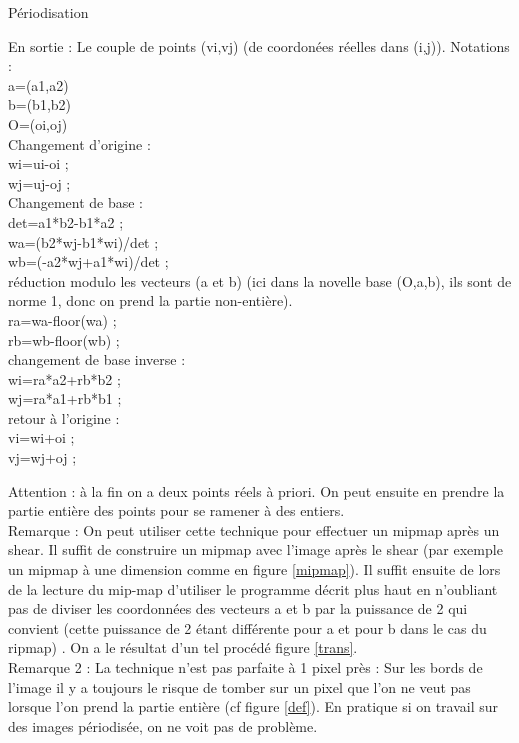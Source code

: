 \documentclass{article}
\begin{document}
\begin{algorithm}
\caption{Périodisation}
En sortie : Le couple de points (vi,vj) (de coordonées réelles dans (i,j)).  \;
Notations : \\
a=(a1,a2)\\
b=(b1,b2)\\
O=(oi,oj)\\
Changement d'origine :\\
 wi=ui-oi ;\\
wj=uj-oj ;\\
Changement de base :\\
det=a1*b2-b1*a2 ;\\
wa=(b2*wj-b1*wi)/det ;\\
wb=(-a2*wj+a1*wi)/det ;\\

réduction modulo les vecteurs (a et b) (ici dans la novelle base (O,a,b), ils sont de norme 1,
donc on prend la partie non-entière).\\

ra=wa-floor(wa) ;\\
rb=wb-floor(wb) ;\\

  changement de base inverse :\\

wi=ra*a2+rb*b2 ;\\
wj=ra*a1+rb*b1 ;\\

 retour à l'origine :\\
 
vi=wi+oi ;\\
vj=wj+oj ;\\


\end{algorithm}

Attention : à la fin on a deux points réels à priori. On peut ensuite en prendre la partie entière des points pour se ramener à des entiers.\\
Remarque : On peut utiliser cette technique pour effectuer un mipmap après un shear. Il suffit de construire un mipmap avec l'image après le shear (par exemple un mipmap à une dimension comme en figure \ref{mipmap}). Il suffit ensuite de lors de la lecture du mip-map d'utiliser le programme décrit plus haut en n'oubliant pas de diviser les coordonnées des vecteurs a et b par la puissance de 2 qui convient (cette puissance de 2 étant différente pour a et pour b dans le cas du ripmap) . On a le résultat d'un tel procédé figure \ref{trans}.\\
Remarque 2 : La technique n'est pas parfaite à 1 pixel près : Sur les bords de l'image il y a toujours le risque de tomber sur un pixel que l'on ne veut pas lorsque l'on prend la partie entière (cf figure \ref{def}). En pratique si on travail sur des images périodisée, on ne voit pas de problème.
\end{document}
